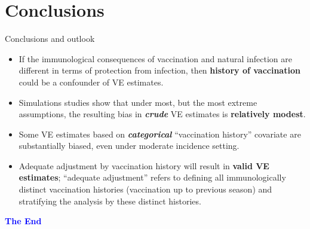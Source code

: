 \documentclass{beamer}
\begin{document}
\section{Conclusions}

\begin{frame}{Conclusions and outlook}

{\scriptsize 	
	\begin{itemize}
	\item If the immunological consequences of vaccination and natural infection are different in terms of protection from infection, then \textbf{history of vaccination} could be a confounder of VE estimates.
	\item Simulations studies show that under most, but the most extreme assumptions, the resulting bias in \emph{\textbf{crude}} VE estimates is\textbf{ relatively modest}.
	\item Some VE estimates based on \emph{\textbf{categorical}} ``vaccination history'' covariate are substantially biased, even under moderate incidence setting.
	\item Adequate adjustment by vaccination history will result in \textbf{valid VE estimates}; ``adequate adjustment'' refers to defining all immunologically distinct vaccination histories (vaccination up to previous season) and stratifying the analysis by these distinct histories.
\end{itemize}}
\end{frame}
%
\begin{frame}
	\centering
		\LARGE \textbf{\textcolor{blue}{The End}}
		\visible<2->{\large \textbf{\textcolor{red}{...}}} 
\end{frame}
%
%
%	
\end{document}
